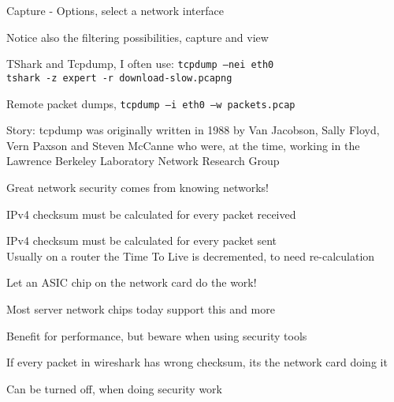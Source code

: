 \documentclass[Screen16to9,17pt]{foils}
\begin{document}


\centerline{}



\centerline{Capture - Options, select a network interface}



\centerline{Notice also the filtering possibilities, capture and view}






\begin{list2}
\item TShark and Tcpdump, I often use: \verb+tcpdump –nei eth0+\\
\verb+tshark -z expert -r download-slow.pcapng+

\item Remote packet dumps, \verb+tcpdump –i eth0 –w packets.pcap+

\item Story: tcpdump was originally written in 1988 by Van Jacobson, Sally Floyd, Vern Paxson and Steven McCanne who were, at the time, working in the Lawrence Berkeley Laboratory Network Research Group\\
\end{list2}

\vskip 5mm

\centerline{\Large Great network security comes from knowing networks!}






\begin{list1}
\item IPv4 checksum must be calculated for every packet received
\item IPv4 checksum must be calculated for every packet sent\\
Usually on a router the Time To Live is decremented, to need re-calculation
\vskip 1cm
\item Let an ASIC chip on the network card do the work!
\item Most server network chips today support this and more
\item Benefit for performance, but beware when using security tools
\item If every packet in wireshark has wrong checksum, its the network card doing it
\item Can be turned off, when doing security work
\end{list1}
\vskip 1cm
\end{document}
